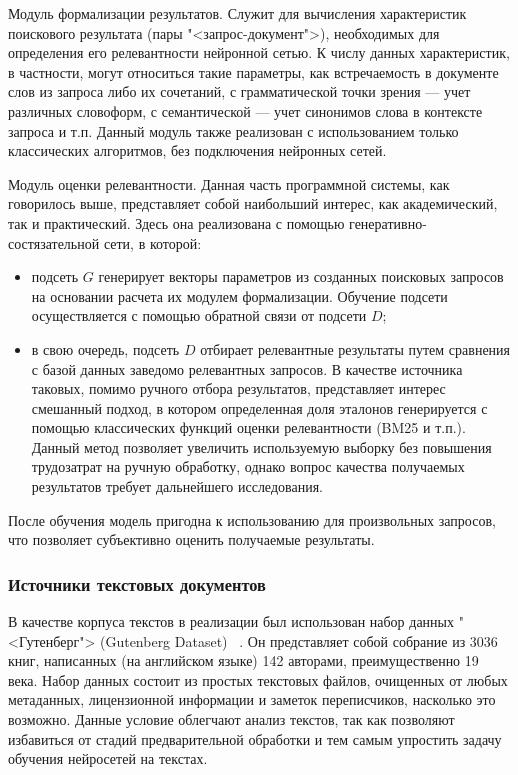 Модуль формализации результатов. Служит для вычисления характеристик поискового результата (пары "<запрос-документ">), необходимых для определения его 
релевантности нейронной сетью. К числу данных характеристик, в частности, могут относиться такие параметры, как встречаемость в документе слов из запроса
либо их сочетаний, с грамматической точки зрения --- учет различных словоформ, с семантической --- учет синонимов слова в контексте запроса и т.п.
Данный модуль также реализован с использованием только классических алгоритмов, без подключения нейронных сетей.

Модуль оценки релевантности. Данная часть программной системы, как говорилось выше, представляет собой наибольший интерес, как академический, так
и практический. Здесь она реализована с помощью генеративно-состязательной сети, в которой:
\begin{itemize}
\item подсеть $G$ генерирует векторы параметров из созданных поисковых запросов на основании расчета их модулем формализации. Обучение подсети осуществляется
с помощью обратной связи от подсети $D$;
\item в свою очередь, подсеть $D$ отбирает релевантные результаты путем сравнения с базой данных заведомо релевантных запросов. В качестве источника таковых,
помимо ручного отбора результатов, представляет интерес смешанный подход, в котором определенная доля эталонов генерируется с помощью классических функций
оценки релевантности (BM25 и т.п.). Данный метод позволяет увеличить используемую выборку без повышения трудозатрат на ручную обработку, однако вопрос
качества получаемых результатов требует дальнейшего исследования.
\end{itemize}
После обучения модель пригодна к использованию для произвольных запросов, что позволяет субъективно оценить получаемые результаты.

\subsubsection{Источники текстовых документов}
\label{lab:sources-grammar}
В качестве корпуса текстов в реализации был использован набор данных "<Гутенберг"> (Gutenberg Dataset) ~\cite{lahiri:2014:SRW}. 
Он представляет собой собрание из 3036 книг, написанных (на английском языке) 142 авторами, преимущественно 19 века. 
Набор данных состоит из простых текстовых файлов, очищенных от любых метаданных, лицензионной информации и заметок переписчиков, 
насколько это возможно. Данные условие облегчают анализ текстов, так как позволяют избавиться от стадий предварительной обработки
и тем самым упростить задачу обучения нейросетей на текстах.

